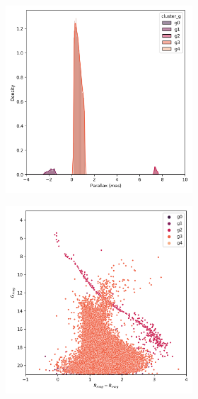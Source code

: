 \documentclass[11pt,a4paper,english,twocolumn]{article}
\begin{document}
\begin{figure}[htbp]
\begin{subfigure}{\columnwidth}
\begin{subfigure}[t]{0.30\textwidth}
    \end{subfigure}
    \hfill
    \begin{subfigure}[t]{0.30\textwidth}
      \centering
      \includegraphics[width=\textwidth]{../figures/melotte_22/dec_parallax_filtered_melotte_22.png}
    \end{subfigure}
    \hfill
    \begin{subfigure}[t]{0.30\textwidth}
      \centering
      \includegraphics[width=\textwidth]{../figures/melotte_22/dec_hr_diagram_filtered_melotte_22.png}

\end{subfigure}
\end{subfigure}
\end{figure}
\end{document}
